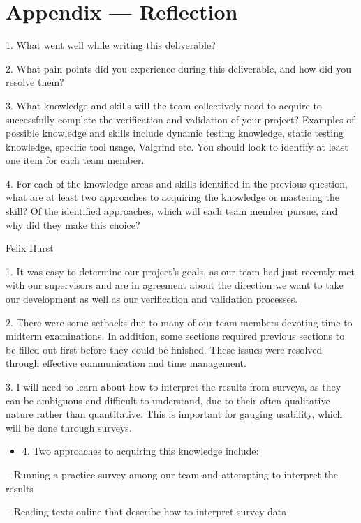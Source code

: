 \documentclass[12pt, titlepage]{article}
\begin{document}
\section{Appendix — Reflection}

1. What went well while writing this deliverable?

2. What pain points did you experience during this deliverable, and how did you resolve them?

3. What knowledge and skills will the team collectively need to acquire to successfully complete the verification and validation of your project? Examples of possible knowledge and skills include dynamic testing knowledge, static testing knowledge, specific tool usage, Valgrind etc. You should look to identify at least one item for each team member.

4. For each of the knowledge areas and skills identified in the previous question, what are at least two approaches to acquiring the knowledge or mastering the skill? Of the identified approaches, which will each team member pursue, and why did they make this choice?

Felix Hurst

1. It was easy to determine our project's goals, as our team had just recently met with our supervisors and are in agreement about the direction we want to take our development as well as our verification and validation processes.

2. There were some setbacks due to many of our team members devoting time to midterm examinations. In addition, some sections required previous sections to be filled out first before they could be finished. These issues were resolved through effective communication and time management.

3. I will need to learn about how to interpret the results from surveys, as they can be ambiguous and difficult to understand, due to their often qualitative nature rather than quantitative. This is important for gauging usability, which will be done through surveys.

\begin{itemize}
  \item 4. Two approaches to acquiring this knowledge include:
\end{itemize}

-- Running a practice survey among our team and attempting to interpret the results

-- Reading texts online that describe how to interpret survey data
\end{document}
